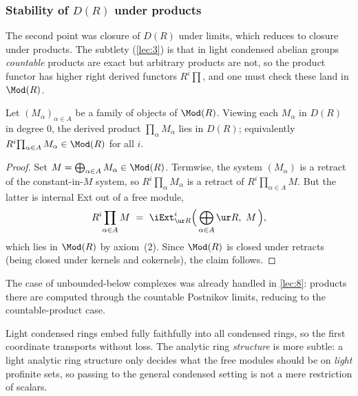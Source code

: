 \subsubsection*{Stability of $D(R)$ under products}

The second point was closure of $D(R)$ under limits, which reduces to closure
under products. The subtlety (\cref{lec:3}) is that in light condensed abelian
groups \emph{countable} products are exact but arbitrary products are not, so
the product functor has higher right derived functors $R^{i}\!\prod$, and one
must check these land in $\Mod(R)$.

\begin{proposition}
\label{prop:9:products}
Let $(M_{\alpha})_{\alpha\in A}$ be a family of objects of $\Mod(R)$. Viewing
each $M_{\alpha}$ in $D(R)$ in degree $0$, the derived product
$\prod_{\alpha}M_{\alpha}$ lies in $D(R)$; equivalently
$R^{i}\!\prod_{\alpha\in A}M_{\alpha}\in\Mod(R)$ for all $i$.
\end{proposition}

\begin{proof}
Set $M=\bigoplus_{\alpha\in A}M_{\alpha}\in\Mod(R)$. Termwise, the system
$(M_{\alpha})$ is a retract of the constant-in-$M$ system, so
$R^{i}\!\prod_{\alpha}M_{\alpha}$ is a retract of $R^{i}\!\prod_{\alpha\in A}M$.
But the latter is internal Ext out of a free module,
\begin{equation*}
R^{i}\!\prod_{\alpha\in A}M\ =\ \iExt^{i}_{\ur R}\Bigl(\,\bigoplus_{\alpha\in A}
\ur R,\ M\,\Bigr),
\end{equation*}
which lies in $\Mod(R)$ by axiom~(2). Since $\Mod(R)$ is closed under retracts
(being closed under kernels and cokernels), the claim follows.
\end{proof}

The case of unbounded-below complexes was already handled in \cref{lec:8}:
products there are computed through the countable Postnikov limits, reducing to
the countable-product case.

\begin{remark}
\label{rmk:9:light-vs-general}
Light condensed rings embed fully faithfully into all condensed rings, so the
first coordinate transports without loss. The analytic ring \emph{structure} is
more subtle: a light analytic ring structure only decides what the free modules
should be on \emph{light} profinite sets, so passing to the general condensed
setting is not a mere restriction of scalars.
\end{remark}

